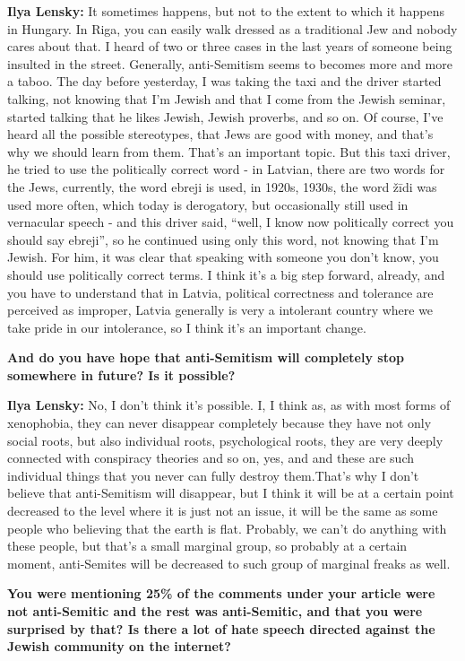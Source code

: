 \textbf{Ilya Lensky:} It sometimes happens, but not to the extent to which it happens in Hungary. In Riga, you can easily walk dressed as a traditional Jew and nobody cares about that. I heard of two or three cases in the last years of someone being insulted in the street. Generally, anti-Semitism seems to becomes more and more a taboo. The day before yesterday, I was taking the taxi and the driver started talking, not knowing that I’m Jewish and that I come from the Jewish seminar, started talking that he likes Jewish, Jewish proverbs, and so on. Of course, I’ve heard all the possible stereotypes, that Jews are good with money, and that’s why we should learn from them. That’s an important topic. But this taxi driver, he tried to use the politically correct word - in Latvian, there are two words for the Jews, currently, the word ebreji is used, in 1920s, 1930s, the word žīdi was used more often, which today is derogatory, but occasionally still used in vernacular speech - and this driver said, ``well, I know now politically correct you should say ebreji'', so he continued using only this word, not knowing that I’m Jewish. For him, it was clear that speaking with someone you don’t know, you should use politically correct terms. I think it’s a big step forward, already, and you have to understand that in Latvia, political correctness and tolerance are perceived as improper, Latvia generally is very a intolerant country where we take pride in our intolerance, so I think it’s an important change. 

\textbf{And do you have hope that anti-Semitism will completely stop somewhere in future? Is it possible?} 

\textbf{Ilya Lensky:} No, I don’t think it’s possible. I, I think as, as with most forms of xenophobia, they can never disappear completely because they have not only social roots, but also individual roots, psychological roots, they are very deeply connected with conspiracy theories and so on, yes, and and these are such individual things that you never can fully destroy them.That’s why I don’t believe that anti-Semitism will disappear, but I think it will be at a certain point decreased to the level where it is just not an issue, it will be the same as some people who believing that the earth is flat. Probably, we can’t do anything with these people, but that’s a small marginal group, so probably at a certain moment, anti-Semites will be decreased to such group of marginal freaks as well. 

\textbf{You were mentioning 25\% of the comments under your article were not anti-Semitic and the rest was anti-Semitic, and that you were surprised  by that? Is there a lot of hate speech directed against the Jewish community on the internet?} 


